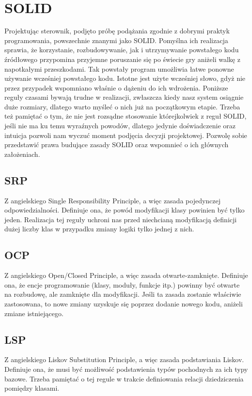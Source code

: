 \chapter{SOLID}
Projektując sterownik, podjęto próbę podążania zgodnie z dobrymi praktyk programowania, powszechnie znanymi jako SOLID.
Pomyślna ich realizacja sprawia, że korzystanie, rozbudowywanie, jak i utrzymywanie powstałego kodu źródłowego przypomina
przyjemne poruszanie się po świecie gry aniżeli walkę z napotkałymi przeszkodami. 
Tak powstały program umożliwia łatwe ponowne używanie wcześniej powstałego kodu. 
Istotne jest użyte wcześniej słowo, gdyż nie przez przypadek wspomniano właśnie o dążeniu do ich wdrożenia.
Poniższe reguły czasami bywają trudne w realizacji, zwłaszcza kiedy nasz system osiągnie duże rozmiary, dlatego warto myśleć o nich już na początkowym etapie. 
Trzeba też pamiętać o tym, że nie jest rozsądne stosowanie którejkolwiek z reguł SOLID, jeśli nie ma ku temu wyraźnych powodów, dlatego 
jedynie doświadczenie oraz intuicja pozwoli nam wyczuć moment podjęcia decyzji projektowej.
Pozwolę sobie przedstawić prawa budujące zasady SOLID oraz wspomnieć o ich głównych założeniach.

\section{SRP}
Z angielskiego Single Responsibility Principle, a więc zasada pojedynczej odpowiedzialności.
Definiuje ona, że powód modyfikacji klasy powinien być tylko jeden.
\cite[103]{martin2015zwinne}
Realizacja tej reguły uchroni nas przed niechcianą modyfikacją definicji dużej liczby klas w przypadku zmiany logiki tylko jednej z nich.

\section{OCP}
Z angielskiego Open/Closed Principle, a więc zasada otwarte-zamknięte.
Definiuje ona, że encje programowanie (klasy, moduły, funkcje itp.) powinny być otwarte na rozbudowę, ale zamknięte dla modyfikacji.
\cite[117]{martin2015zwinne}
Jeśli ta zasada zostanie właściwie zastosowana, to nowe zmiany uzyskuje się poprzez dodanie nowego kodu, aniżeli zmiane istniejącego. 

\section{LSP}
Z angielskiego Liskov Substitution Principle, a więc zasada podstawiania Liskov.
Definiuje ona, że musi być możliwość podstawienia typów pochodnych za ich typy bazowe.
\cite[127]{martin2015zwinne}
Trzeba pamiętać o tej regule w trakcie definiowania relacji dziedziczenia pomiędzy klasami.

